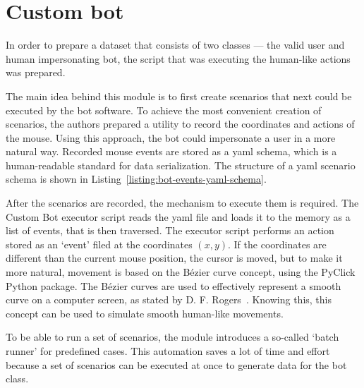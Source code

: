 \section{Custom bot}\label{sec:custom-bot}
In order to prepare a dataset that consists of two classes --- the valid user and human impersonating bot, the script that was executing the human-like actions was prepared.

The main idea behind this module is to first create scenarios that next could be executed by the bot software.
To achieve the most convenient creation of scenarios, the authors prepared a utility to record the coordinates and actions of the mouse.
Using this approach, the bot could impersonate a user in a more natural way.
Recorded mouse events are stored as a \gls{yaml} schema, which is a human-readable standard for data serialization.
The structure of a \gls{yaml} scenario schema is shown in Listing~\ref{listing:bot-events-yaml-schema}.


After the scenarios are recorded, the mechanism to execute them is required.
The Custom Bot executor script reads the \gls{yaml} file and loads it to the memory as a list of events, that is then traversed.
The executor script performs an action stored as an `event' filed at the coordinates $(x, y)$.
If the coordinates are different than the current mouse position, the cursor is moved, but to make it more natural, movement is based on the Bézier curve concept, using the PyClick Python package.
The Bézier curves are used to effectively represent a smooth curve on a computer screen, as stated by D. F. Rogers~\cite{bezier-curves}.
Knowing this, this concept can be used to simulate smooth human-like movements.

To be able to run a set of scenarios, the module introduces a so-called `batch runner' for predefined cases.
This automation saves a lot of time and effort because a set of scenarios can be executed at once to generate data for the bot class.

